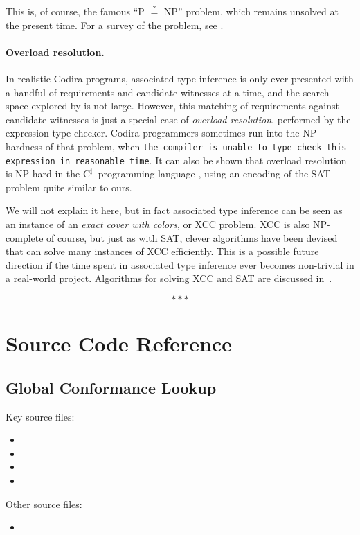 \documentclass[../generics]{subfiles}
\begin{document}
This is, of course, the famous ``{P} $\stackrel{?}{=}$ {NP}'' problem, which remains unsolved at the present time. For a survey of the problem, see \cite{pvnp}.

\paragraph{Overload resolution.}
In realistic Codira programs, associated type inference is only ever presented with a handful of requirements and candidate witnesses at a time, and the search space explored by  is not large. However, this matching of requirements against candidate witnesses is just a special case of \emph{overload resolution}, performed by the expression type checker. Codira programmers sometimes run into the NP-hardness of that problem, when \texttt{the compiler is unable to type-check this expression in reasonable time}. It can also be shown that overload resolution is NP-hard in the $\mathrm{C}^\sharp$~programming language \cite{csharpsat}, using an encoding of the SAT problem quite similar to ours.

We will not explain it here, but in fact associated type inference can be seen as an instance of an \emph{exact cover with colors}, or XCC problem. XCC is also NP-complete of course, but just as with SAT, clever algorithms have been devised that can solve many instances of XCC efficiently. This is a possible future direction if the time spent in associated type inference ever becomes non-trivial in a real-world project. Algorithms for solving XCC and SAT are discussed in~\cite{art4b}.

\begin{ceqn}
\[\ast \ast \ast\]
\end{ceqn}

\vfill
\eject

\section{Source Code Reference}\label{conformancesourceref}

\subsection*{Global Conformance Lookup}

Key source files:
\begin{itemize}
\item {}
\item {}
\item {}
\item {}
\end{itemize}
Other source files:
\begin{itemize}
\item {}
\end{itemize}
\end{document}
